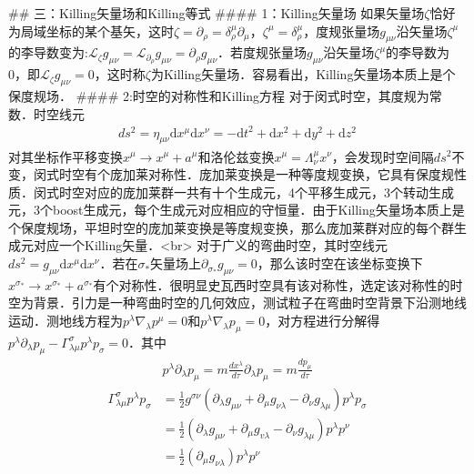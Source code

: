 ## 三：Killing矢量场和Killing等式
#### 1：Killing矢量场
如果矢量场$\zeta$恰好为局域坐标的某个基矢，这时$\zeta=\partial_{\rho}=\delta_{\rho}^{\mu} \partial_{\mu}$，$\zeta^{\mu}=\delta_{\rho}^{\mu}$，度规张量场$g_{\mu \nu}$沿矢量场$\zeta^{\mu}$的李导数变为:$\mathcal{L}_{\zeta} g_{\mu \nu} =\mathcal{L}_{\partial_{\rho}} g_{\mu \nu}=\partial_{\rho} g_{\mu \nu}$．若度规张量场$g_{\mu \nu}$沿矢量场$\zeta^{\mu}$的李导数为0，即$\mathcal{L}_{\zeta} g_{\mu \nu} =0$，这时称$\zeta$为Killing矢量场．容易看出，Killing矢量场本质上是个保度规场．
#### 2:时空的对称性和Killing方程
对于闵式时空，其度规为常数．时空线元$$\begin{aligned}
d s^{2}=\eta_{\mu \nu} \mathrm{d} x^{\mu} \mathrm{d} x^{\nu}=-\mathrm{d} t^{2}+\mathrm{d} x^{2}+\mathrm{d} y^{2}+\mathrm{d} z^{2}
\end{aligned}$$对其坐标作平移变换$x^{\mu}\rightarrow x^{\mu}+a^{\mu}$和洛伦兹变换$x^{\mu}=\Lambda^{\mu}_{\nu} x^{\nu}$，会发现时空间隔$d s^{2}$不变，闵式时空有个庞加莱对称性．庞加莱变换是一种等度规变换，它具有保度规性质．闵式时空对应的庞加莱群一共有十个生成元，4个平移生成元，3个转动生成元，3个boost生成元，每个生成元对应相应的守恒量．由于Killing矢量场本质上是个保度规场，平坦时空的庞加莱变换是等度规变换，那么庞加莱群对应的每个群生成元对应一个Killing矢量．<br>
对于广义的弯曲时空，其时空线元$d s^{2}=g_{\mu \nu} \mathrm{d} x^{\mu} \mathrm{d} x^{\nu}$．若在$\sigma_{*}$矢量场上$\partial_{\sigma_{*}} g_{\mu \nu}=0$，那么该时空在该坐标变换下$x^{\sigma_{*}} \rightarrow x^{\sigma_{*}}+a^{\sigma_{*}}$有个对称性．很明显史瓦西时空具有该对称性，选定该对称性的时空为背景．引力是一种弯曲时空的几何效应，测试粒子在弯曲时空背景下沿测地线运动．测地线方程为$p^{\lambda} \nabla_{\lambda} p^{\mu}=0$和$p^{\lambda} \nabla_{\lambda} p_{\mu}=0$，对方程进行分解得$p^{\lambda} \partial_{\lambda} p_{\mu}-\Gamma_{\lambda \mu}^{\sigma} p^{\lambda} p_{\sigma}=0$．其中$$\begin{aligned}
p^{\lambda} \partial_{\lambda} p_{\mu}=m \frac{d x^{\lambda}}{d \tau} \partial_{\lambda} p_{\mu}=m \frac{d p_{\mu}}{d \tau}\end{aligned}$$
$$\begin{aligned}
\Gamma_{\lambda \mu}^{\sigma} p^{\lambda} p_{\sigma} &=\frac{1}{2} g^{\sigma \nu}\left(\partial_{\lambda} g_{\mu \nu}+\partial_{\mu} g_{\nu\lambda}-\partial_{\nu} g_{\lambda \mu}\right) p^{\lambda} p_{\sigma} \\
&=\frac{1}{2}\left(\partial_{\lambda} g_{\mu \nu}+\partial_{\mu} g_{v \lambda}-\partial_{\nu} g_{\lambda \mu}\right) p^{\lambda} p^{\nu} \\
&=\frac{1}{2}\left(\partial_{\mu} g_{\nu \lambda}\right) p^{\lambda} p^{\nu}
\end{aligned}$$
